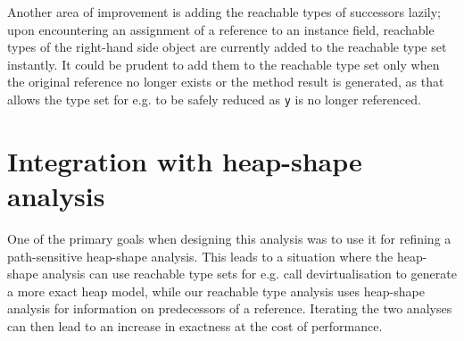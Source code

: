 Another area of improvement is adding the reachable types of successors lazily; upon encountering an assignment of a reference to an instance field, reachable types of the right-hand side object are currently added to the reachable type set instantly. It could be prudent to add them to the reachable type set only when the original reference no longer exists or the method result is generated, as that allows the type set for e.g.  to be safely reduced as \texttt{y} is no longer referenced.

\section{Integration with heap-shape analysis}
One of the primary goals when designing this analysis was to use it for refining a path-sensitive heap-shape analysis. This leads to a situation where the heap-shape analysis can use reachable type sets for e.g. call devirtualisation to generate a more exact heap model, while our reachable type analysis uses heap-shape analysis for information on predecessors of a reference. Iterating the two analyses can then lead to an increase in exactness at the cost of performance.